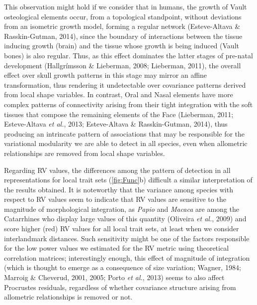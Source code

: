 \documentclass[12pt,]{article}
\begin{document}
This observation might hold if we consider that in humans, the growth of
Vault osteological elements occur, from a topological standpoint,
without deviations from an isometric growth model, forming a regular
network (Esteve-Altava \& Rasskin-Gutman, 2014), since the boundary of
interactions between the tissue inducing growth (brain) and the tissue
whose growth is being induced (Vault bones) is also regular. Thus, as
this effect dominates the latter stages of pre-natal development
(Hallgrímsson \& Lieberman, 2008; Lieberman, 2011), the overall effect
over skull growth patterns in this stage may mirror an affine
transformation, thus rendering it undetectable over covariance patterns
derived from local shape variables. In contrast, Oral and Nasal elements
have more complex patterns of connectivity arising from their tight
integration with the soft tissues that compose the remaining elements of
the Face (Lieberman, 2011; Esteve-Altava \emph{et al.}, 2013;
Esteve-Altava \& Rasskin-Gutman, 2014), thus producing an intrincate
pattern of associations that may be responsible for the variational
modularity we are able to detect in all species, even when allometric
relationships are removed from local shape variables.

Regarding RV values, the differences among the pattern of detection in
all representations for local trait sets (\autoref{fig:Func}b) difficult
a similar interpretation of the results obtained. It is noteworthy that
the variance among species with respect to RV values seem to indicate
that RV values are sensitive to the magnitude of morphological
integration, as \emph{Papio} and \emph{Macaca} are among the Catarrhines
who display large values of this quantity (Oliveira \emph{et al.}, 2009)
and score higher (red) RV values for all local trait sets, at least when
we consider interlandmark distances. Such sensitivity might be one of
the factors responsible for the low power values we estimated for the RV
metric using theoretical correlation matrices; interestingly enough,
this effect of magnitude of integration (which is thought to emerge as a
consequence of size variation; Wagner, 1984; Marroig \& Cheverud, 2001,
2005; Porto \emph{et al.}, 2013) seems to also affect Procrustes
residuals, regardless of whether covariance structure arising from
allometric relationships is removed or not.
\end{document}
